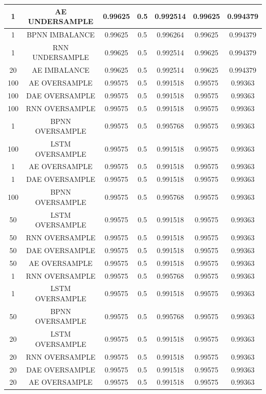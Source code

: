 \begin{longtable}{|c|c|c|c|c|c|c|}
	1 & AE UNDERSAMPLE & 0.99625 & 0.5 & 0.992514 & 0.99625 & 0.994379\\ \hline
	1 & BPNN IMBALANCE & 0.99625 & 0.5 & 0.996264 & 0.99625 & 0.994379\\ \hline
	1 & RNN UNDERSAMPLE & 0.99625 & 0.5 & 0.992514 & 0.99625 & 0.994379\\ \hline
	20 & AE IMBALANCE & 0.99625 & 0.5 & 0.992514 & 0.99625 & 0.994379\\ \hline
	100 & AE OVERSAMPLE & 0.99575 & 0.5 & 0.991518 & 0.99575 & 0.99363\\ \hline
	100 & DAE OVERSAMPLE & 0.99575 & 0.5 & 0.991518 & 0.99575 & 0.99363\\ \hline
	100 & RNN OVERSAMPLE & 0.99575 & 0.5 & 0.991518 & 0.99575 & 0.99363\\ \hline
	1 & BPNN OVERSAMPLE & 0.99575 & 0.5 & 0.995768 & 0.99575 & 0.99363\\ \hline
	100 & LSTM OVERSAMPLE & 0.99575 & 0.5 & 0.991518 & 0.99575 & 0.99363\\ \hline
	1 & AE OVERSAMPLE & 0.99575 & 0.5 & 0.991518 & 0.99575 & 0.99363\\ \hline
	1 & DAE OVERSAMPLE & 0.99575 & 0.5 & 0.991518 & 0.99575 & 0.99363\\ \hline
	100 & BPNN OVERSAMPLE & 0.99575 & 0.5 & 0.995768 & 0.99575 & 0.99363\\ \hline
	50 & LSTM OVERSAMPLE & 0.99575 & 0.5 & 0.991518 & 0.99575 & 0.99363\\ \hline
	50 & RNN OVERSAMPLE & 0.99575 & 0.5 & 0.991518 & 0.99575 & 0.99363\\ \hline
	50 & DAE OVERSAMPLE & 0.99575 & 0.5 & 0.991518 & 0.99575 & 0.99363\\ \hline
	50 & AE OVERSAMPLE & 0.99575 & 0.5 & 0.991518 & 0.99575 & 0.99363\\ \hline
	1 & RNN OVERSAMPLE & 0.99575 & 0.5 & 0.995768 & 0.99575 & 0.99363\\ \hline
	1 & LSTM OVERSAMPLE & 0.99575 & 0.5 & 0.991518 & 0.99575 & 0.99363\\ \hline
	50 & BPNN OVERSAMPLE & 0.99575 & 0.5 & 0.995768 & 0.99575 & 0.99363\\ \hline
	20 & LSTM OVERSAMPLE & 0.99575 & 0.5 & 0.991518 & 0.99575 & 0.99363\\ \hline
	20 & RNN OVERSAMPLE & 0.99575 & 0.5 & 0.991518 & 0.99575 & 0.99363\\ \hline
	20 & DAE OVERSAMPLE & 0.99575 & 0.5 & 0.991518 & 0.99575 & 0.99363\\ \hline
	20 & AE OVERSAMPLE & 0.99575 & 0.5 & 0.991518 & 0.99575 & 0.99363\\ \hline

\end{longtable}

